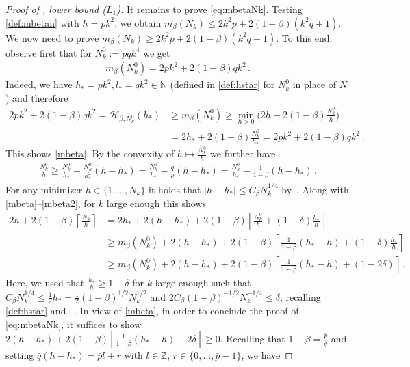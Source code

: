 \documentclass[reqno]{amsart}
\theoremstyle{plain}
\theoremstyle{definition}
\numberwithin{equation}{section}
\newcommand{\defas}{:=}
\begin{document}
\begin{proof}[Proof of ,  lower bound   {\rm ($L_1$)}]
It remains to prove \eqref{eq:mbetaNk}. Testing \eqref{def:mbetan} with $h=pk^2$, we obtain $m_\beta(N_k) \leq 2k^2p + 2(1-\beta) (k^2q+1)$. We now need to prove  $m_\beta(N_k) \geq 2k^2p + 2(1-\beta)(k^2q+1)$. To this end, observe first that for $N_k^0 \defas pqk^4$ we  get
\begin{align}\label{mbeta}
m_\beta(N_k^0) =2pk^2 + 2(1-\beta)  qk^2\,.
\end{align}
Indeed,  we have  $h_*=pk^2,l_*=qk^2 \in \mathbb{N}$ (defined in \eqref{def:hstar}  for $N_k^0$ in place of $N$)  and therefore 
\begin{align*}
2pk^2 + 2(1-\beta)  qk^2 = \mathcal{H}_{\beta, N_k^0  }(h_*) &\geq m_\beta(N_k^0) \geq \min_{h>0} \Big( 2h+ 2(1-\beta) \frac{ N_k^0 }{h}\Big) \\&= 2h_* + 2(1-\beta) \frac{ N_k^0 }{h_*} = 2pk^2 + 2(1-\beta)  qk^2\,.
\end{align*}
This shows \eqref{mbeta}.  By the convexity of  $h\mapsto \frac{N_k^0}{h}$ we further have
\begin{align}\label{mbeta2}
\frac{N_k^0}{h} \ge \frac{N_k^0}{h_*} - \frac{N_k^0}{h_*^2} (h-h_*) = \frac{N_k^0}{h_*} - \frac{q}{p}  (h-h_*) = \frac{N_k^0}{h_*} -  \frac{1}{1-\beta}     (h-h_*) \, .
\end{align}
For  any minimizer $h \in \{1,\ldots, N_k\}$ it holds that  $|h- h_*
| \leq C_\beta N_k^{1/4}  $ by~.  Along
 with \eqref{mbeta}--\eqref{mbeta2}, for $k$ large enough  
this   shows \begin{align*}
2h + 2(1-\beta) \left\lceil \frac{N_k}{h}\right\rceil &= 2 h_*   +2(h- h_*  ) + 2(1-\beta)  \left\lceil \frac{N_k^0}{h}+(1-\delta)\frac{h_*}{h}\right\rceil  \\&
\geq m_\beta(N_k^0) +2(h-h_*) + 2(1-\beta)  \left\lceil  \frac{1}{1-\beta}    (h_*-h)+(1-\delta)\frac{h_*}{h}\right\rceil   \\&\geq  m_\beta(N_k^0) +2(h-h_*) + 2(1-\beta) \left\lceil  \frac{1}{1-\beta}    (h_*-h)+(1-2\delta)\right\rceil\,.
\end{align*}
Here, we used that $\frac{h_*}{h} \ge 1 - \delta$ for $k$ large enough
such that $C_\beta N_k^{1/4}\leq \frac{1}{2} h_* =
\frac{1}{2}(1-\beta)^{1/2}N_k^{1/2}$ and $ 2 C_\beta (1-\beta)^{-1/2}
N_k^{-1/4}\leq \delta $, recalling  \eqref{def:hstar} and
~. In view of \eqref{mbeta}, in order to
conclude the proof of \eqref{eq:mbetaNk}, it  suffices to show
$2(h-h_*) + 2(1-\beta)  \left\lceil \frac{1}{1-\beta}
  (h_*-h)-2\delta\right\rceil \geq 0$. Recalling  that  $
1-\beta  =\frac{\bar{p}}{\bar{q}}$ and  setting   $\bar{q}(h-h_*) =\bar{p}l+r$ with $l \in \mathbb{Z}$, $r \in \{0,\ldots,\bar{p}-1\}$, we have

\end{proof}
\end{document}
